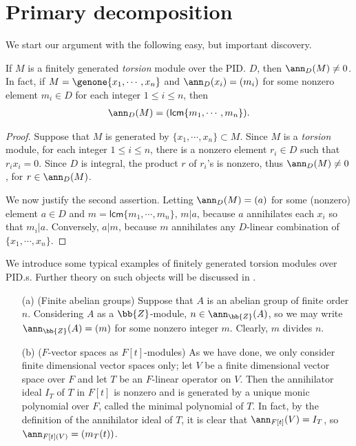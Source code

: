 \section{Primary decomposition}

We start our argument with the following easy, but important discovery.
\begin{obs}
    If $M$ is a finitely generated \textit{torsion} module over the PID. $D$, then $\ann_D(M)\neq 0$.
    In fact, if $M=\genone{x_1, \cdots, x_n}$ and $\ann_D(x_i)=(m_i)$ for some nonzero element $m_i\in D$ for each integer $1\leq i\leq n$, then
    \begin{align*}
        \ann_D(M)=(\textsf{lcm}\{m_1, \cdots, m_n\}).
    \end{align*}
\end{obs}
\begin{proof}
    Suppose that $M$ is generated by $\{x_1, \cdots, x_n\}\subset M$.
    Since $M$ is a \textit{torsion} module, for each integer $1\leq i\leq n$, there is a nonzero element $r_i\in D$ such that $r_i x_i=0$.
    Since $D$ is integral, the product $r$ of $r_i$'s is nonzero, thus $\ann_D(M)\neq 0$, for $r\in\ann_D(M)$.

    We now justify the second assertion.
    Letting $\ann_D(M)=(a)$ for some (nonzero) element $a\in D$ and $m=\textsf{lcm}\{m_1, \cdots, m_n\}$, $m|a$, because $a$ annihilates each $x_i$ so that $m_i|a$.
    Conversely, $a|m$, because $m$ annihilates any $D$-linear combination of $\{x_1, \cdots, x_n\}$.
\end{proof}

\begin{exmp}
    We introduce some typical examples of finitely generated torsion modules over PID.s.
    Further theory on such objects will be discussed in .
    \begin{enumerate}
        \item[(a)]
        {
            (Finite abelian groups)
            Suppose that $A$ is an abelian group of finite order $n$.
            Considering $A$ as a $\bb{Z}$-module, $n\in\ann_\bb{Z}(A)$, so we may write $\ann_\bb{Z}(A)=(m)$ for some nonzero integer $m$.
            Clearly, $m$ divides $n$.
        }
        \item[(b)]
        {
            ($F$-vector spaces as $F[t]$-modules)
            As we have done, we only consider finite dimensional vector spaces only; let $V$ be a finite dimensional vector space over $F$ and let $T$ be an $F$-linear operator on $V$.
            Then the annihilator ideal $I_T$ of $T$ in $F[t]$ is nonzero and is generated by a unique monic polynomial over $F$, called the minimal polynomial of $T$.
            In fact, by the definition of the annihilator ideal of $T$, it is clear that $\ann_{F[t]}(V)=I_T$, so $\ann_{F[t](V)}=(m_T(t))$.
        }
    \end{enumerate}
\end{exmp}

